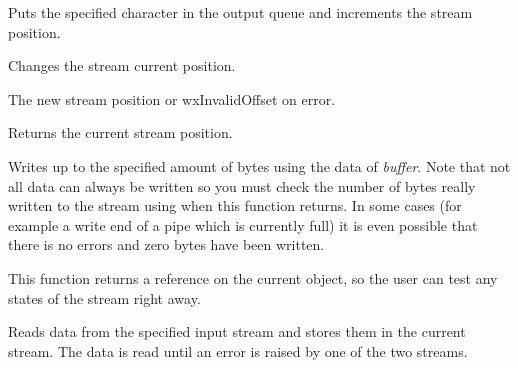 
Puts the specified character in the output queue and increments the
stream position.


\label{wxoutputstreamseeko}


Changes the stream current position.





The new stream position or wxInvalidOffset on error.


\label{wxoutputstreamtello}


Returns the current stream position.


\label{wxoutputstreamwrite}


Writes up to the specified amount of bytes using the data of {\it buffer}. Note
that not all data can always be written so you must check the number of bytes
really written to the stream using  
when this function returns. In some cases (for example a write end of a pipe
which is currently full) it is even possible that there is no errors and zero
bytes have been written.

This function returns a reference on the current object, so the user can test
any states of the stream right away.


Reads data from the specified input stream and stores them 
in the current stream. The data is read until an error is raised
by one of the two streams.

